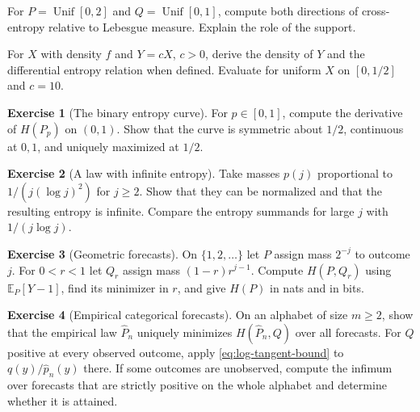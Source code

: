 \documentclass[11pt,oneside]{book}
\theoremstyle{definition}
\newtheorem{exercise}{Exercise}[section]
\theoremstyle{remark}
\begin{document}
\begin{practiceexercise}
\label{wex:uniform-support-cross-entropy}
For $P=\operatorname{Unif}[0,2]$ and $Q=\operatorname{Unif}[0,1]$, compute
both directions of cross-entropy relative to Lebesgue measure. Explain the
role of the support.
\end{practiceexercise}

\begin{practiceexercise}
\label{wex:change-coordinate-differential-entropy}
For $X$ with density $f$ and $Y=cX$, $c>0$, derive the density of $Y$ and
the differential entropy relation when defined. Evaluate for uniform $X$ on
$[0,1/2]$ and $c=10$.
\end{practiceexercise}

\begin{exercise}[The binary entropy curve]
\label{exer:binary-entropy}
For $p\in[0,1]$, compute the derivative of $H(P_p)$ on $(0,1)$.
Show that the curve is symmetric about $1/2$, continuous at $0,1$,
and uniquely maximized at $1/2$.
\end{exercise}

\begin{exercise}[A law with infinite entropy]
\label{exer:infinite-discrete-entropy}
Take masses $p(j)$ proportional to $1/(j(\log j)^2)$
for $j\geq2$. Show that they can be normalized and that the resulting
entropy is infinite. Compare the entropy
summands for large $j$ with $1/(j\log j)$.
\end{exercise}

\begin{exercise}[Geometric forecasts]
\label{exer:geometric-cross-entropy}
On $\{1,2,\ldots\}$ let $P$ assign mass $2^{-j}$ to outcome $j$.
For $0<r<1$ let $Q_r$ assign mass $(1-r)r^{j-1}$. Compute
$H(P,Q_r)$ using $\mathbb E_P[Y-1]$, find its minimizer in $r$,
and give $H(P)$ in nats and in bits.
\end{exercise}

\begin{exercise}[Empirical categorical forecasts]
\label{exer:empirical-categorical-log-loss}
On an alphabet of size $m\geq2$, show that the empirical law
$\widehat P_n$ uniquely minimizes $H(\widehat P_n,Q)$ over all
forecasts. For $Q$ positive at every observed outcome, apply
\eqref{eq:log-tangent-bound} to $q(y)/\widehat p_n(y)$ there.
If some outcomes are unobserved, compute the infimum over forecasts
that are strictly positive on the whole alphabet and determine
whether it is attained.
\end{exercise}
\end{document}
